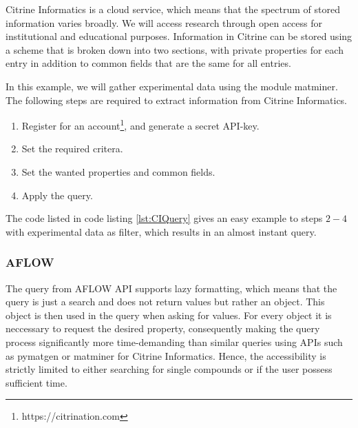 Citrine Informatics is a cloud service, which means that the spectrum of stored information varies broadly. We will access research through open access for institutional and educational purposes. Information in Citrine can be stored using a scheme that is broken down into two sections, with private properties for each entry in addition to common fields that are the same for all entries.%

In this example, we will gather experimental data using the module matminer. The following steps are required to extract information from Citrine Informatics.

\begin{enumerate}
  \item Register for an account\footnote{https://citrination.com}, and generate a secret API-key.
  \item Set the required critera.
  \item Set the wanted properties and common fields.
  \item Apply the query.
\end{enumerate}

The code listed in code listing \ref{lst:CIQuery} gives an easy example to steps $2-4$ with experimental data as filter, which results in an almost instant query.



\subsubsection{AFLOW}

The query from AFLOW API \cite{Curtarolo2012} supports lazy formatting, which means that the query is just a search and does not return values but rather an object. This object is then used in the query when asking for values. For every object it is neccessary to request the desired property, consequently making the query process significantly more time-demanding than similar queries using APIs such as pymatgen or matminer for Citrine Informatics. Hence, the accessibility is strictly limited to either searching for single compounds or if the user possess sufficient time.

